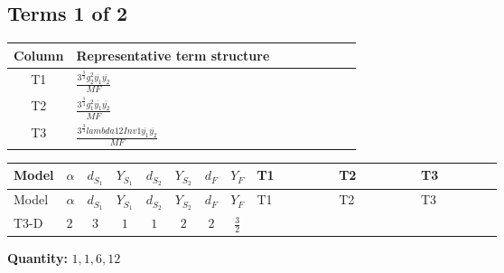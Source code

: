 \documentclass[8pt]{article}
\begin{document}
\begin{landscape}
\subsection*{Terms 1 of 2}
\begin{center}
\begin{tabular}{@{}c >{\raggedright\arraybackslash}p{0.82\linewidth}@{}}
\toprule
Column & Representative term structure \\
\midrule
T1 & \(\displaystyle \frac{3^{\frac{3}{4}} g_{2}^{2} \overline{y_{1}} \overline{y_{2}}}{MF}\) \\
\midrule
T2 & \(\displaystyle \frac{3^{\frac{3}{4}} g_{1}^{2} \overline{y_{1}} \overline{y_{2}}}{MF}\) \\
\midrule
T3 & \(\displaystyle \frac{3^{\frac{3}{4}} lambda12Inv1 \overline{y_{1}} \overline{y_{2}}}{MF}\) \\
\midrule
\bottomrule
\end{tabular}
\end{center}
\smallskip
\tiny
\begin{longtable}{@{}llcccccc >{\raggedright\arraybackslash}p{0.21\linewidth} >{\raggedright\arraybackslash}p{0.21\linewidth} >{\raggedright\arraybackslash}p{0.21\linewidth}@{}}
\toprule
Model & $\alpha$ & $d_{S_1}$ & $Y_{S_1}$ & $d_{S_2}$ & $Y_{S_2}$ & $d_F$ & $Y_F$ & T1 & T2 & T3 \\
\midrule
\endfirsthead
\toprule
Model & $\alpha$ & $d_{S_1}$ & $Y_{S_1}$ & $d_{S_2}$ & $Y_{S_2}$ & $d_F$ & $Y_F$ & T1 & T2 & T3 \\
\midrule
\endhead
T3-D & $2$ & $3$ & $1$ & $1$ & $2$ & $2$ & $\frac{3}{2}$ & \scriptsize\adjustbox{max width=\linewidth}{$\begin{gathered} - \frac{17 \cdot 3^{\frac{3}{4}} g_{2}^{2} \overline{y_{1}} \overline{y_{2}}}{24 MF}\end{gathered}$} & \scriptsize\adjustbox{max width=\linewidth}{$\begin{gathered} - \frac{9 \cdot 3^{\frac{3}{4}} g_{1}^{2} \overline{y_{1}} \overline{y_{2}}}{8 MF}\end{gathered}$} & \scriptsize\adjustbox{max width=\linewidth}{$\begin{gathered} - \frac{3^{\frac{3}{4}} lambda12Inv1 \overline{y_{1}} \overline{y_{2}}}{6 MF}\end{gathered}$} \\
\midrule
\bottomrule
\end{longtable}
\clearpage
\noindent\textbf{Quantity: }$\mathrm{1,1,6,12}$\par\smallskip

\end{landscape}
\end{document}
